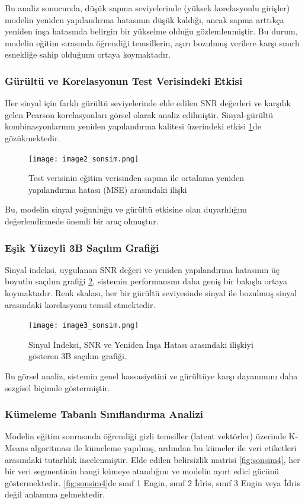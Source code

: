 Bu analiz sonucunda, düşük sapma seviyelerinde (yüksek korelasyonlu girişler) modelin yeniden yapılandırma hatasının düşük kaldığı, ancak sapma arttıkça yeniden inşa hatasında belirgin bir yükselme olduğu gözlemlenmiştir. Bu durum, modelin eğitim sırasında öğrendiği temsillerin, aşırı bozulmuş verilere karşı sınırlı esnekliğe sahip olduğunu ortaya koymaktadır.


\subsubsection{Gürültü ve Korelasyonun Test Verisindeki Etkisi}
Her sinyal için farklı gürültü seviyelerinde elde edilen SNR değerleri ve karşılık gelen Pearson korelasyonları görsel olarak analiz edilmiştir. Sinyal-gürültü kombinasyonlarının yeniden yapılandırma kalitesi üzerindeki etkisi \ref{fig:sonsim2}de gözükmektedir.

\begin{figure}[H]
    \centering
    \texttt{[image: image2\_sonsim.png]}
    \caption{Test verisinin eğitim verisinden sapma ile ortalama yeniden yapılandırma hatası (MSE) arasındaki ilişki}
    \label{fig:sonsim2}
\end{figure}


Bu, modelin sinyal yoğunluğu ve gürültü etkisine olan duyarlılığını değerlendirmede önemli bir araç olmuştur.

\subsubsection{Eşik Yüzeyli 3B Saçılım Grafiği}
Sinyal indeksi, uygulanan SNR değeri ve yeniden yapılandırma hatasının üç boyutlu saçılım grafiği \ref{fig:sonsim3}, sistemin performansını daha geniş bir bakışla ortaya koymaktadır. Renk skalası, her bir gürültü seviyesinde sinyal ile bozulmuş sinyal arasındaki korelasyonu temsil etmektedir.

\begin{figure}[H]
    \centering
    \texttt{[image: image3\_sonsim.png]}
    \caption{Sinyal İndeksi, SNR ve Yeniden İnşa Hatası arasındaki ilişkiyi gösteren 3B saçılım grafiği.}
    \label{fig:sonsim3}
\end{figure}


Bu görsel analiz, sistemin genel hassasiyetini ve gürültüye karşı dayanımını daha sezgisel biçimde göstermiştir.

\subsubsection{Kümeleme Tabanlı Sınıflandırma Analizi}
Modelin eğitim sonrasında öğrendiği gizli temsiller (latent vektörler) üzerinde K-Means algoritması ile kümeleme yapılmış, ardından bu kümeler ile veri etiketleri arasındaki tutarlılık incelenmiştir. Elde edilen belirsizlik matrisi \ref{fig:sonsim4}, her bir veri segmentinin hangi kümeye atandığını ve modelin ayırt edici gücünü göstermektedir. \ref{fig:sonsim4}de sınıf 1 Engin, sınıf 2 İdris, sınıf 3 Engin veya İdris değil anlamına gelmektedir.



